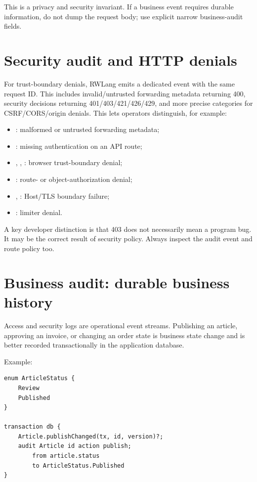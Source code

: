 This is a privacy and security invariant. If a business event requires durable information, do not dump the request body; use explicit narrow business-audit fields.

\section{Security audit and HTTP denials}

For trust-boundary denials, RWLang emits a dedicated  event with the same request ID. This includes invalid/untrusted forwarding metadata returning 400, security decisions returning 401/403/421/426/429, and more precise categories for CSRF/CORS/origin denials. This lets operators distinguish, for example:

\begin{itemize}
  \item {}: malformed or untrusted forwarding metadata;
  \item {}: missing authentication on an API route;
  \item {}, , : browser trust-boundary denial;
  \item {}: route- or object-authorization denial;
  \item {}, : Host/TLS boundary failure;
  \item {}: limiter denial.
\end{itemize}

A key developer distinction is that 403 does not necessarily mean a program bug. It may be the correct result of security policy. Always inspect the audit event and route policy too.

\section{Business audit: durable business history}

Access and security logs are operational event streams. Publishing an article, approving an invoice, or changing an order state is business state change and is better recorded transactionally in the application database.

Example:

\begin{lstlisting}[language=RWLang]
enum ArticleStatus {
    Review
    Published
}

transaction db {
    Article.publishChanged(tx, id, version)?;
    audit Article id action publish;
        from article.status
        to ArticleStatus.Published
}
\end{lstlisting}

